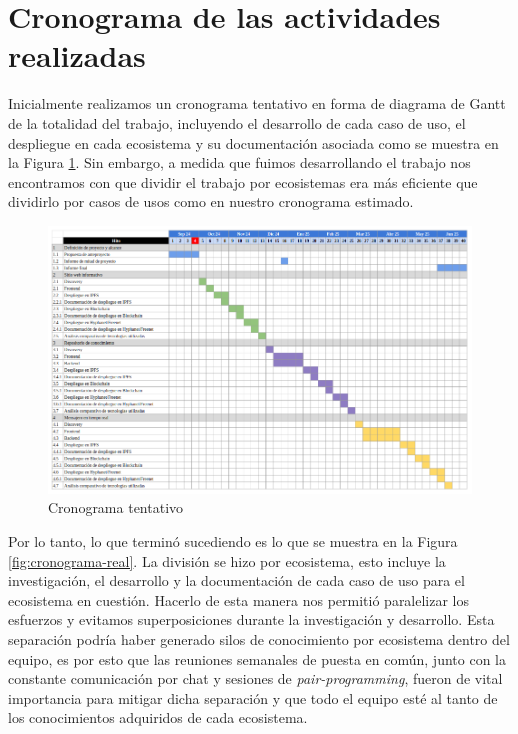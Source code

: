 \section{Cronograma de las actividades realizadas}

Inicialmente realizamos un cronograma tentativo en forma de diagrama de Gantt de la totalidad del trabajo, incluyendo el desarrollo de cada caso de uso, el despliegue en cada ecosistema y su documentación asociada como se muestra en la Figura \ref{fig:cronograma-tentativo}. Sin embargo, a medida que fuimos desarrollando el trabajo nos encontramos con que dividir el trabajo por ecosistemas era más eficiente que dividirlo por casos de usos como en nuestro cronograma estimado.

\begin{figure}[H]
    \includegraphics[width=1\linewidth]{img/cronograma.png}
    \caption{Cronograma tentativo}
    \label{fig:cronograma-tentativo}
\end{figure}

Por lo tanto, lo que terminó sucediendo es lo que se muestra en la Figura \ref{fig:cronograma-real}. La división se hizo por ecosistema, esto incluye la investigación, el desarrollo y la documentación de cada caso de uso para el ecosistema en cuestión. Hacerlo de esta manera nos permitió paralelizar los esfuerzos y evitamos superposiciones durante la investigación y desarrollo. Esta separación podría haber generado silos de conocimiento por ecosistema dentro del equipo, es por esto que las reuniones semanales de puesta en común, junto con la constante comunicación por chat y sesiones de \textit{pair-programming}, fueron de vital importancia para mitigar dicha separación y que todo el equipo esté al tanto de los conocimientos adquiridos de cada ecosistema.

